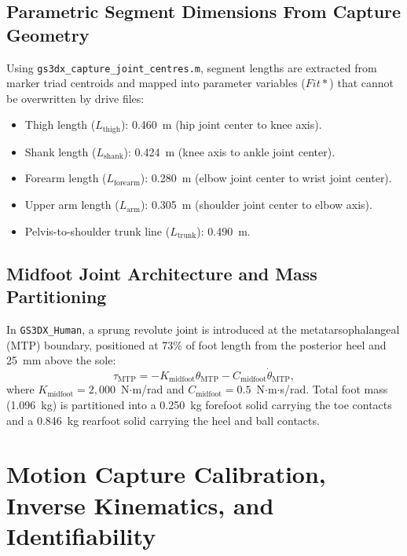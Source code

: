\documentclass[11pt,a4paper]{article}
\begin{document}
\subsection{Parametric Segment Dimensions From Capture Geometry}
Using \texttt{gs3dx\_capture\_joint\_centres.m}, segment lengths are extracted from marker triad centroids and mapped into parameter variables ($Fit*$) that cannot be overwritten by drive files:
\begin{itemize}
    \item Thigh length ($L_{\text{thigh}}$): 0.460~m (hip joint center to knee axis).
    \item Shank length ($L_{\text{shank}}$): 0.424~m (knee axis to ankle joint center).
    \item Forearm length ($L_{\text{forearm}}$): 0.280~m (elbow joint center to wrist joint center).
    \item Upper arm length ($L_{\text{arm}}$): 0.305~m (shoulder joint center to elbow axis).
    \item Pelvis-to-shoulder trunk line ($L_{\text{trunk}}$): 0.490~m.
\end{itemize}

\subsection{Midfoot Joint Architecture and Mass Partitioning}
In \texttt{GS3DX\_Human}, a sprung revolute joint is introduced at the metatarsophalangeal (MTP) boundary, positioned at 73\% of foot length from the posterior heel and 25~mm above the sole:
\begin{equation}
    \tau_{\text{MTP}} = -K_{\text{midfoot}} \theta_{\text{MTP}} - C_{\text{midfoot}} \dot{\theta}_{\text{MTP}},
\end{equation}
where $K_{\text{midfoot}} = 2,000$~N$\cdot$m/rad and $C_{\text{midfoot}} = 0.5$~N$\cdot$m$\cdot$s/rad. Total foot mass (1.096~kg) is partitioned into a 0.250~kg forefoot solid carrying the toe contacts and a 0.846~kg rearfoot solid carrying the heel and ball contacts.

\section{Motion Capture Calibration, Inverse Kinematics, and Identifiability}
\end{document}
